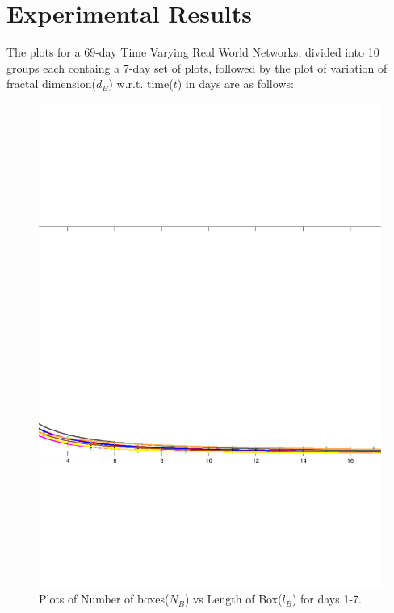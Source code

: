 \documentclass{article}
\begin{document}
\section{Experimental Results}
The plots for a 69-day Time Varying Real World Networks, divided into 10 groups each containg a 7-day set of plots, followed by the plot of variation of fractal dimension($d_B$) w.r.t. time($t$) in days are as follows:
\begin{figure}
\centering
\includegraphics[scale=0.3]{plot1/plot1}
\caption{Plots of Number of boxes($N_B$) vs Length of Box($l_B$) for days 1-7.}
\end{figure}
\end{document}
